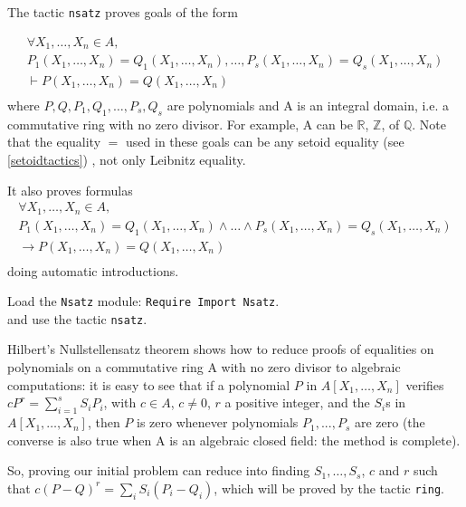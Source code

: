 
The tactic \texttt{nsatz} proves goals of the form

\[ \begin{array}{l}
  \forall X_1,\ldots,X_n \in A,\\
   P_1(X_1,\ldots,X_n) = Q_1(X_1,\ldots,X_n) , \ldots ,  P_s(X_1,\ldots,X_n) =Q_s(X_1,\ldots,X_n)\\
 \vdash P(X_1,\ldots,X_n) = Q(X_1,\ldots,X_n)\\
  \end{array}
\]
where $P,Q, P_1,Q_1,\ldots,P_s,Q_s$ are polynomials and A is an integral
domain, i.e. a commutative ring with no zero divisor. For example, A can be
$\mathbb{R}$, $\mathbb{Z}$, of $\mathbb{Q}$. Note that the equality $=$ used in these
goals can be any setoid equality
(see \ref{setoidtactics})
, not only Leibnitz equality.

It also proves formulas
\[ \begin{array}{l}
  \forall X_1,\ldots,X_n \in A,\\
   P_1(X_1,\ldots,X_n) = Q_1(X_1,\ldots,X_n) \wedge \ldots \wedge  P_s(X_1,\ldots,X_n) =Q_s(X_1,\ldots,X_n)\\
 \rightarrow P(X_1,\ldots,X_n) = Q(X_1,\ldots,X_n)\\
  \end{array}
\] doing automatic introductions.


Load the
\texttt{Nsatz} module: \texttt{Require Import Nsatz}.\\
 and use the tactic \texttt{nsatz}.


Hilbert's Nullstellensatz theorem shows how to reduce proofs of equalities on
polynomials on a commutative ring A with no zero divisor to algebraic computations: it is easy to see that if a polynomial
$P$ in $A[X_1,\ldots,X_n]$ verifies $c P^r = \sum_{i=1}^{s} S_i P_i$, with $c
\in A$, $c \not = 0$, $r$ a positive integer, and the $S_i$s in
$A[X_1,\ldots,X_n]$, then $P$ is zero whenever polynomials $P_1,...,P_s$  are
zero (the converse is also true when A is an algebraic closed field:
the method is complete).

So, proving our initial problem can reduce into finding $S_1,\ldots,S_s$, $c$
and $r$ such that $c (P-Q)^r = \sum_{i} S_i (P_i-Q_i)$, which will be proved by the
tactic \texttt{ring}.

